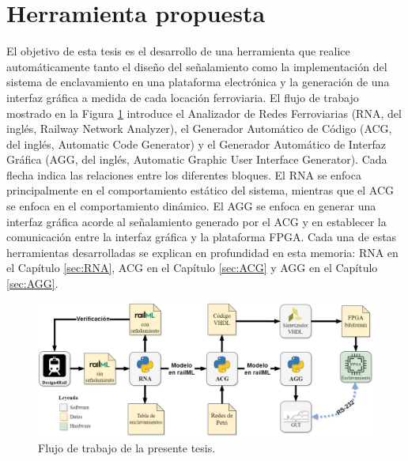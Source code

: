 \section{Herramienta propuesta}

    El objetivo de esta tesis es el desarrollo de una herramienta que realice automáticamente tanto el diseño del señalamiento como la implementación del sistema de enclavamiento en una plataforma electrónica y la generación de una interfaz gráfica a medida de cada locación ferroviaria. El flujo de trabajo mostrado en la Figura \ref{fig:workflow} introduce el Analizador de Redes Ferroviarias (RNA, del inglés, Railway Network Analyzer), el Generador Automático de Código (ACG, del inglés, Automatic Code Generator) y el Generador Automático de Interfaz Gráfica (AGG, del inglés, Automatic Graphic User Interface Generator). Cada flecha indica las relaciones entre los diferentes bloques. El RNA se enfoca principalmente en el comportamiento estático del sistema, mientras que el ACG se enfoca en el comportamiento dinámico. El AGG se enfoca en generar una interfaz gráfica acorde al señalamiento generado por el ACG y en establecer la comunicación entre la interfaz gráfica y la plataforma FPGA. Cada una de estas herramientas desarrolladas se explican en profundidad en esta memoria: RNA en el Capítulo \ref{sec:RNA}, ACG en el Capítulo \ref{sec:ACG} y AGG en el Capítulo \ref{sec:AGG}.

    \begin{figure}[H]
        \centering
        \includegraphics[width=1\textwidth]{Figuras/workflow.png}
        \centering\caption{Flujo de trabajo de la presente tesis.}
        \label{fig:workflow}
    \end{figure}

